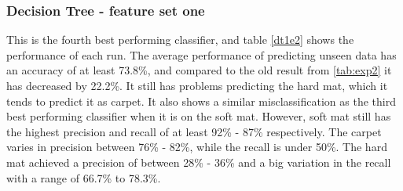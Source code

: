 \documentclass[USenglish]{ifimaster}  %
\begin{document}
	
	

\subsubsection{Decision Tree - feature set one}
This is the fourth best performing classifier, and table \ref{dt1e2} shows the performance of each run. The average performance of predicting unseen data has an accuracy of at least 73.8\%, and compared to the old result from \ref{tab:exp2} it has decreased by 22.2\%. It still has problems predicting the hard mat, which it tends to predict it as carpet. It also shows a similar misclassification as the third best performing classifier when it is on the soft mat. However, soft mat still has the highest precision and recall of at least 92\% - 87\% respectively. The carpet varies in precision between 76\% - 82\%, while the recall is under 50\%. The hard mat achieved a precision of between 28\% - 36\% and a big variation in the recall with a range of 66.7\% to 78.3\%.
\end{document}
